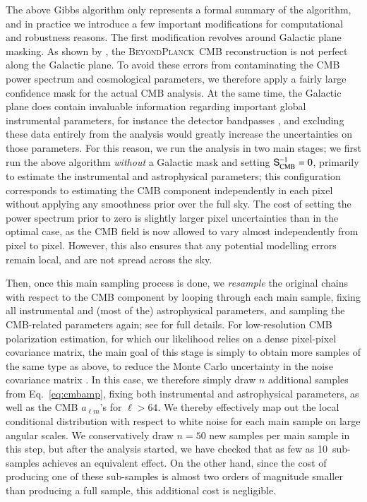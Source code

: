 \documentclass[onecolumn]{aa}
\renewcommand{\S}[0]{\tens{S}}
\newcommand{\BP}{\textsc{BeyondPlanck}}
\begin{document}
The above Gibbs algorithm only represents a formal summary of the
algorithm, and in practice we introduce a few important modifications
for computational and robustness reasons. The first modification
revolves around Galactic plane masking. As shown by \citet{bp11}, the
\BP\ CMB reconstruction is not perfect along the Galactic plane. To
avoid these errors from contaminating the CMB power spectrum and
cosmological parameters, we therefore apply a fairly large confidence
mask for the actual CMB analysis. At the same time, the Galactic plane
does contain invaluable information regarding important global
instrumental parameters, for instance the detector bandpasses
\citep{bp09}, and excluding these data entirely from the analysis
would greatly increase the uncertainties on those parameters. For this
reason, we run the analysis in two main stages; we first run the above
algorithm \emph{without} a Galactic mask and setting
$\S_{\mathrm{CMB}}^{-1} = 0$, primarily to estimate the
instrumental and astrophysical parameters; this configuration
corresponds to estimating the CMB component independently in each
pixel without applying any smoothness prior over the full sky. The
cost of setting the power spectrum prior to zero is slightly larger
pixel uncertainties than in the optimal case, as the CMB field is now
allowed to vary almost independently from pixel to pixel. However,
this also ensures that any potential modelling errors remain local,
and are not spread across the sky.

Then, once this main sampling process is done, we \emph{resample} the
original chains with respect to the CMB component by looping through
each main sample, fixing all instrumental and (most of the)
astrophysical parameters, and sampling the CMB-related parameters
again; see \citet{bp11} for full details. For low-resolution CMB
polarization estimation, for which our likelihood relies on a dense
pixel-pixel covariance matrix, the main goal of this stage is simply
to obtain more samples of the same type as above, to reduce the Monte
Carlo uncertainty in the noise covariance matrix
\citep{sellentin2016}. In this case, we therefore simply draw $n$
additional samples from Eq.~\eqref{eq:cmbamp}, fixing both
instrumental and astrophysical parameters, as well as the CMB $a_{\ell
  m}$'s for $\ell>64$. We thereby effectively map out the local
conditional distribution with respect to white noise for each main sample
on large angular scales. We conservatively draw $n=50$ new samples per
main sample in this step, but after the analysis started, we have
checked that as few as 10~sub-samples achieves an equivalent
effect. On the other hand, since the cost of producing one of these
sub-samples is almost two orders of magnitude smaller than producing a
full sample, this additional cost is negligible.
\end{document}
